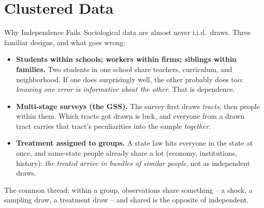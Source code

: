 \documentclass[aspectratio=169,11pt,xcolor=dvipsnames]{beamer}
\newcommand{\core}{\,\raisebox{0.6pt}{\textcolor{corestar}{$\bigstar$}}}
\begin{document}
\section[Clustering]{Clustered Data}
\begin{frame}\sectionpage\end{frame}

\begin{frame}{Why Independence Fails\core}
Sociological data are almost never i.i.d.\ draws. Three familiar designs,
and what goes wrong:
\begin{itemize}\itemsep3pt
  \item \textbf{Students within schools; workers within firms; siblings
        within families.} Two students in one school share teachers,
        curriculum, and neighborhood. If one does surprisingly well, the
        other probably does too: \emph{knowing one error is informative
        about the other}. That is dependence.
  \item \textbf{Multi-stage surveys (the GSS).} The survey first draws
        \emph{tracts}, then people within them. Which tracts got drawn is
        luck, and everyone from a drawn tract carries that tract's
        peculiarities into the sample \emph{together}.
  \item \textbf{Treatment assigned to groups.} A state law hits everyone in
        the state at once, and same-state people already share a lot
        (economy, institutions, history): \emph{the treated arrive in
        bundles of similar people}, not as independent draws.
\end{itemize}
\vskip2pt
The common thread: \alert{within a group, observations share something} --
a shock, a sampling draw, a treatment draw -- \alert{and shared is the
opposite of independent}.
\end{frame}
\end{document}
